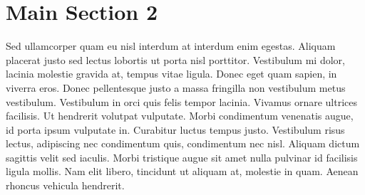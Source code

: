 
\section{Main Section 2}

Sed ullamcorper quam eu nisl interdum at interdum enim egestas. Aliquam
placerat justo sed lectus lobortis ut porta nisl porttitor. Vestibulum mi
dolor, lacinia molestie gravida at, tempus vitae ligula. Donec eget quam
sapien, in viverra eros. Donec pellentesque justo a massa fringilla non
vestibulum metus vestibulum. Vestibulum in orci quis felis tempor lacinia.
Vivamus ornare ultrices facilisis. Ut hendrerit volutpat vulputate. Morbi
condimentum venenatis augue, id porta ipsum vulputate in. Curabitur luctus
tempus justo. Vestibulum risus lectus, adipiscing nec condimentum quis,
condimentum nec nisl. Aliquam dictum sagittis velit sed iaculis. Morbi
tristique augue sit amet nulla pulvinar id facilisis ligula mollis. Nam elit
libero, tincidunt ut aliquam at, molestie in quam. Aenean rhoncus vehicula
hendrerit.

